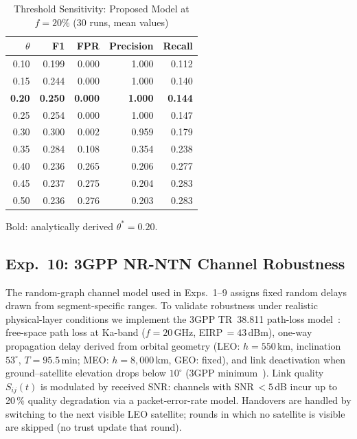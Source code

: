 \documentclass[journal,twoside,10pt]{IEEEtran}
\begin{document}
\begin{table}[t]
\centering
\caption{Threshold Sensitivity: Proposed Model at $f\!=\!20\%$
         (30 runs, mean values)}
\label{tab:theta_sweep}
\renewcommand{\arraystretch}{1.15}
\small
\begin{tabular}{rrrrr}
\toprule
$\theta$ & F1 & FPR & Precision & Recall \\
\midrule
0.10 & 0.199 & 0.000 & 1.000 & 0.112 \\
0.15 & 0.244 & 0.000 & 1.000 & 0.140 \\
\textbf{0.20} & \textbf{0.250} & \textbf{0.000} & \textbf{1.000} & \textbf{0.144} \\
0.25 & 0.254 & 0.000 & 1.000 & 0.147 \\
0.30 & 0.300 & 0.002 & 0.959 & 0.179 \\
0.35 & 0.284 & 0.108 & 0.354 & 0.238 \\
0.40 & 0.236 & 0.265 & 0.206 & 0.277 \\
0.45 & 0.237 & 0.275 & 0.204 & 0.283 \\
0.50 & 0.236 & 0.276 & 0.203 & 0.283 \\
\bottomrule
\end{tabular}
{\footnotesize Bold: analytically derived $\theta^*\!=\!0.20$.}
\end{table}

\subsection{Exp.~10: 3GPP NR-NTN Channel Robustness}
\label{sec:exp10}

The random-graph channel model used in Exps.~1--9 assigns fixed random delays
drawn from segment-specific ranges.
To validate robustness under realistic physical-layer conditions we implement
the 3GPP TR~38.811 path-loss model~\cite{3gpp38811}: free-space path loss at
Ka-band ($f\!=\!20$\,GHz, EIRP\,$=\!43$\,dBm), one-way propagation delay
derived from orbital geometry (LEO: $h\!=\!550$\,km, inclination
$53^\circ$, $T\!=\!95.5$\,min; MEO: $h\!=\!8{,}000$\,km, GEO: fixed),
and link deactivation when ground--satellite elevation drops below
$10^\circ$ (3GPP minimum~\cite{3gpp38821}).
Link quality $S_{ij}(t)$ is modulated by received SNR: channels with
SNR\,$<\!5$\,dB incur up to 20\,\% quality degradation via a
packet-error-rate model.
Handovers are handled by switching to the next visible LEO satellite; rounds
in which no satellite is visible are skipped (no trust update that round).
\end{document}
